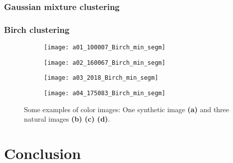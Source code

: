 \subsubsection{Gaussian mixture clustering}
\subsubsection{Birch clustering}


\begin{figure}[!ht]
    
    \begin{subfigure}[b]{0.24\textwidth}
    	\centering
    	\texttt{[image: a01\_100007\_Birch\_min\_segm]}
        \caption{}
        \label{fig:}
    \end{subfigure}
    \begin{subfigure}[b]{0.24\textwidth}
    	\centering
        \texttt{[image: a02\_160067\_Birch\_min\_segm]}
        \caption{}
        \label{fig:}
    \end{subfigure} 
    \begin{subfigure}[b]{0.24\textwidth}
    	\centering
        \texttt{[image: a03\_2018\_Birch\_min\_segm]}
        \caption{}
        \label{fig:}
    \end{subfigure}
    \begin{subfigure}[b]{0.24\textwidth}
    	\centering
        \texttt{[image: a04\_175083\_Birch\_min\_segm]}
        \caption{}
        \label{fig:}
    \end{subfigure}
                  
    \caption{Some examples of color images: One synthetic image {\small \textsf{\textbf{(a)}}} and three natural images {\small \textsf{\textbf{(b) (c) (d)}}}.}\label{fig:clustering_results}    
\end{figure}




\section{Conclusion}
